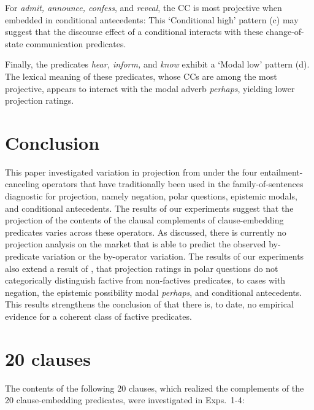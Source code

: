 \documentclass[a4paper,12pt,twoside]{article}
\begin{document}
	For \emph{admit, announce, confess}, and \emph{reveal}, the CC is most projective when embedded in conditional antecedents: This `Conditional high' pattern (c) may suggest that the discourse effect of a conditional interacts with these change-of-state communication predicates.
	
	Finally, the predicates \emph{hear, inform,} and \emph{know} exhibit a `Modal low' pattern (d). The lexical meaning of these predicates, whose CCs are among the most projective, appears to interact with the modal adverb {\em perhaps}, yielding lower projection ratings.

\section{Conclusion}

This paper investigated variation in projection from under the four entailment-canceling operators that have traditionally been used in the family-of-sentences diagnostic for projection, namely negation, polar questions, epistemic modals, and conditional antecedents. The results of our experiments suggest that the projection of the contents of the clausal complements of clause-embedding predicates varies across these operators. As discussed, there is currently no projection analysis on the market that is able to predict the observed by-predicate variation or the by-operator variation. The results of our experiments also extend a result of \citealt{degen_are_2022}, that projection ratings in polar questions do not categorically distinguish factive from non-factives predicates, to cases with negation, the epistemic possibility modal \textit{perhaps}, and conditional antecedents. This results strengthens the conclusion of \citealt{degen_are_2022} that there is, to date, no empirical evidence for a coherent class of factive predicates.






\newpage
\appendix

\section{20 clauses}\label{app:a-clauses}
    The contents of the following 20 clauses, which realized the complements of the 20 clause-embedding predicates, were investigated in Exps.~1-4:
\end{document}
